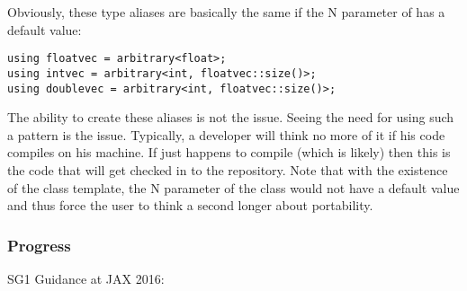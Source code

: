 Obviously, these type aliases are basically the same if the \code N parameter of  has a default value:
\smallskip\begin{lstlisting}[style=Vc]
using floatvec = arbitrary<float>;
using intvec = arbitrary<int, floatvec::size()>;
using doublevec = arbitrary<int, floatvec::size()>;
\end{lstlisting}
The ability to create these aliases is not the issue.
Seeing the need for using such a pattern is the issue.
Typically, a developer will think no more of it if his code compiles on his machine.
If  just happens to compile (which is likely) then this is the code that will get checked in to the repository.
Note that with the existence of the  class template, the \code N parameter of the  class would not have a default value and thus force the user to think a second longer about portability.

\subsubsection{Progress}\label{sec:fixedsize progress}
\newcommand\common[2]{\code{\textit{common}(\type{#1}, \type{#2})}}
\newcommand\commonabi[3]{\code{\textit{commonabi}(\type{#1}, \type{#2}, \type{#3})}}

SG1 Guidance at JAX 2016:\\

